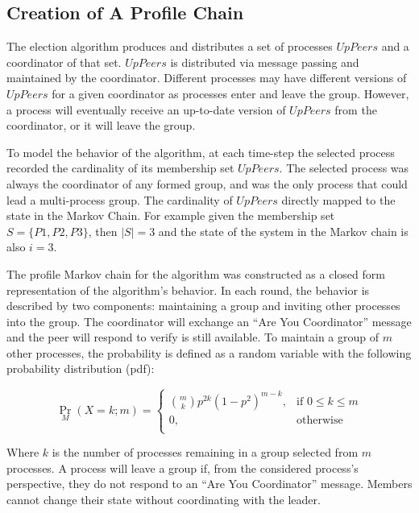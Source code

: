 \subsection{Creation of A Profile Chain}

The election algorithm produces and distributes a set of processes $UpPeers$ and a coordinator of that set.
$UpPeers$ is distributed via message passing and maintained by the coordinator.
Different processes may have different versions of $UpPeers$ for a given coordinator as processes enter and leave the group.
However, a process will eventually receive an up-to-date version of $UpPeers$ from the coordinator, or it will leave the group.

To model the behavior of the algorithm, at each time-step the selected process recorded the cardinality of its membership set $UpPeers$.
The selected process was always the coordinator of any formed group, and was the only process that could lead a multi-process group.
The cardinality of $UpPeers$ directly mapped to the state in the Markov Chain.
For example given the membership set $S=\{P1,P2,P3\}$, then $\left | S \right |=3$ and the state of the system in the Markov chain is also $i=3$.

The profile Markov chain for the algorithm was constructed as a closed form representation of the algorithm's behavior.
In each round, the behavior is described by two components: maintaining a group and inviting other processes into the group.
The coordinator will exchange an ``Are You Coordinator'' message and the peer will respond to verify is still available.
To maintain a group of $m$ other processes, the probability is defined as a random variable with the following probability distribution (pdf):

\begin{equation}
 \Pr_{M}(X=k; m) =
   \begin{cases}
    \binom{m}{k} p^{2k}(1-p^2)^{m-k}, & \text{if } 0 \leq k \leq m \\
    0,                                & \text{otherwise} \\
  \end{cases}
\end{equation}

Where $k$ is the number of processes remaining in a group selected from $m$ processes.
A process will leave a group if, from the considered process's perspective, they do not respond to an ``Are You Coordinator'' message.
Members cannot change their state without coordinating with the leader.

